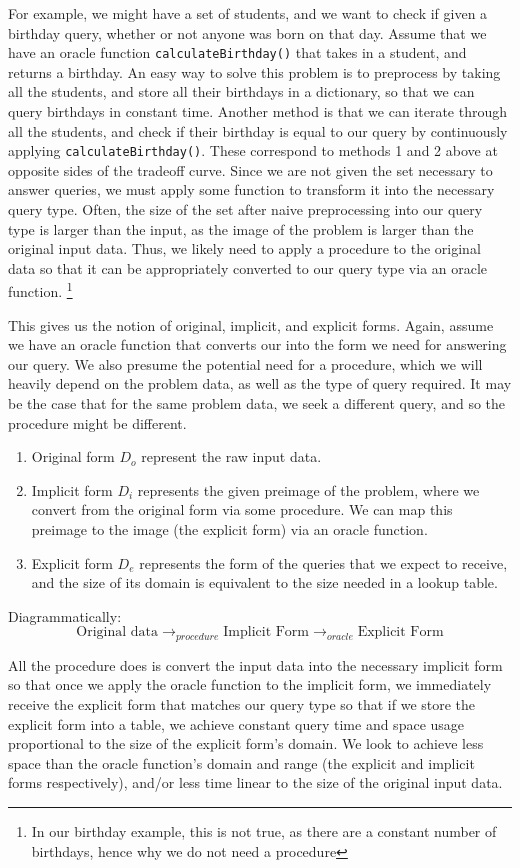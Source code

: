 \documentclass{article}
\begin{document}
For example, we might have a set of students, and we want to check if given a birthday query, whether or not anyone was born on that day. Assume that we have an oracle function \texttt{calculateBirthday()} that takes in a student, and returns a birthday. An easy way to solve this problem is to preprocess by taking all the students, and store all their birthdays in a dictionary, so that we can query birthdays in constant time. Another method is that we can iterate through all the students, and check if their birthday is equal to our query by continuously applying \texttt{calculateBirthday()}. These correspond to methods 1 and 2 above at opposite sides of the tradeoff curve. Since we are not given the set necessary to answer queries, we must apply some function to transform it into the necessary query type. Often, the size of the set after naive preprocessing into our query type is larger than the input, as the image of the problem is larger than the original input data. Thus, we likely need to apply a procedure to the original data so that it can be appropriately converted to our query type via an oracle function. \footnote{In our birthday example, this is not true, as there are a constant number of birthdays, hence why we do not need a procedure}

This gives us the notion of original, implicit, and explicit forms. Again, assume we have an oracle function that converts our into the form we need for answering our query. We also presume the potential need for a procedure, which we will heavily depend on the problem data, as well as the type of query required. It may be the case that for the same problem data, we seek a different query, and so the procedure might be different. 
\begin{enumerate}
    \item Original form $D_o$ represent the raw input data.
    \item Implicit form $D_i$ represents the given preimage of the problem, where we convert from the original form via some procedure. We can map this preimage to the image (the explicit form) via an oracle function.
    \item Explicit form $D_e$ represents the form of the queries that we expect to receive, and the size of its domain is equivalent to the size needed in a lookup table.
\end{enumerate}
Diagrammatically:
$$\text{Original data} \rightarrow_{procedure} \text{Implicit Form} \rightarrow_{oracle} \text{Explicit Form}$$

All the procedure does is convert the input data into the necessary implicit form so that once we apply the oracle function to the implicit form, we immediately receive the explicit form that matches our query type so that if we store the explicit form into a table, we achieve constant query time and space usage proportional to the size of the explicit form's domain. We look to achieve less space than the oracle function's domain and range (the explicit and implicit forms respectively), and/or less time linear to the size of the original input data.
\end{document}
